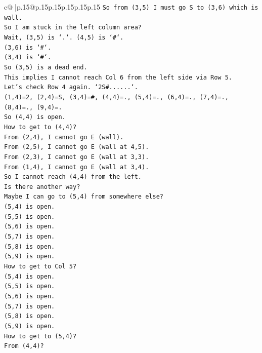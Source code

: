 \documentclass{article}
\begin{document}
{\begin{supertabular}{c@{$\;$}|p{.15\linewidth}@{}p{.15\linewidth}p{.15\linewidth}p{.15\linewidth}p{.15\linewidth}p{.15\linewidth}}
{{{\texttt{So from (3,5) I must go S to (3,6) which is wall.} \\
\texttt{So I am stuck in the left column area?} \\
\texttt{Wait, (3,5) is `.`. (4,5) is `\#`.} \\
\texttt{(3,6) is `\#`.} \\
\texttt{(3,4) is `\#`.} \\
\texttt{So (3,5) is a dead end.} \\
\texttt{This implies I cannot reach Col 6 from the left side via Row 5.} \\
\texttt{Let's check Row 4 again. `2S\#......`.} \\
\texttt{(1,4)=2, (2,4)=S, (3,4)=\#, (4,4)=., (5,4)=., (6,4)=., (7,4)=., (8,4)=., (9,4)=.} \\
\texttt{So (4,4) is open.} \\
\texttt{How to get to (4,4)?} \\
\texttt{From (2,4), I cannot go E (wall).} \\
\texttt{From (2,5), I cannot go E (wall at 4,5).} \\
\texttt{From (2,3), I cannot go E (wall at 3,3).} \\
\texttt{From (1,4), I cannot go E (wall at 3,4).} \\
\texttt{So I cannot reach (4,4) from the left.} \\
\texttt{Is there another way?} \\
\texttt{Maybe I can go to (5,4) from somewhere else?} \\
\texttt{(5,4) is open.} \\
\texttt{(5,5) is open.} \\
\texttt{(5,6) is open.} \\
\texttt{(5,7) is open.} \\
\texttt{(5,8) is open.} \\
\texttt{(5,9) is open.} \\
\texttt{How to get to Col 5?} \\
\texttt{(5,4) is open.} \\
\texttt{(5,5) is open.} \\
\texttt{(5,6) is open.} \\
\texttt{(5,7) is open.} \\
\texttt{(5,8) is open.} \\
\texttt{(5,9) is open.} \\
\texttt{How to get to (5,4)?} \\
\texttt{From (4,4)?} \\
}}}
\end{supertabular}}
\end{document}
